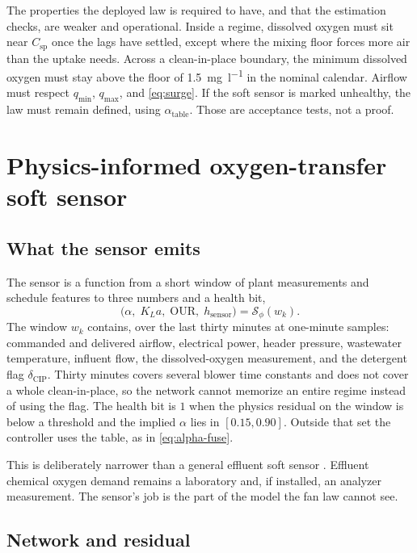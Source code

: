 The properties the deployed law is required to have, and that the estimation checks, are weaker and operational. Inside a regime, dissolved oxygen must sit near $C_{\mathrm{sp}}$ once the lags have settled, except where the mixing floor forces more air than the uptake needs. Across a clean-in-place boundary, the minimum dissolved oxygen must stay above the floor of \SI{1.5}{\milli\gram\per\litre} in the nominal calendar. Airflow must respect $q_{\min}$, $q_{\max}$, and \eqref{eq:surge}. If the soft sensor is marked unhealthy, the law must remain defined, using $\alpha_{\mathrm{table}}$. Those are acceptance tests, not a proof.

\section{Physics-informed oxygen-transfer soft sensor}
\label{sec:piots}

\subsection{What the sensor emits}

The sensor is a function from a short window of plant measurements and schedule features to three numbers and a health bit,
\begin{equation}
\label{eq:sensor-map}
\big(\alpha,\; K_La,\; \mathrm{OUR},\; h_{\mathrm{sensor}}\big)
=
\mathcal{S}_{\phi}(w_{k}).
\end{equation}
The window $w_{k}$ contains, over the last thirty minutes at one-minute samples: commanded and delivered airflow, electrical power, header pressure, wastewater temperature, influent flow, the dissolved-oxygen measurement, and the detergent flag $\delta_{\mathrm{CIP}}$. Thirty minutes covers several blower time constants and does not cover a whole clean-in-place, so the network cannot memorize an entire regime instead of using the flag. The health bit is $1$ when the physics residual on the window is below a threshold and the implied $\alpha$ lies in $[0.15,0.90]$. Outside that set the controller uses the table, as in \eqref{eq:alpha-fuse}.

This is deliberately narrower than a general effluent soft sensor \cite{haimi2013soft,newhart2019,corominas2018}. Effluent chemical oxygen demand remains a laboratory and, if installed, an analyzer measurement. The sensor's job is the part of the model the fan law cannot see.

\subsection{Network and residual}

